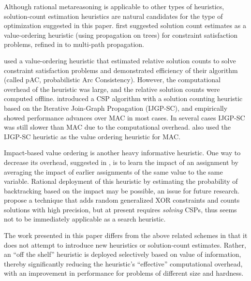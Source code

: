 Although rational metareasoning is applicable 
to other types of heuristics, solution-count estimation heuristics are
natural candidates for the type of optimization suggested in this paper.
\cite{Dechter.cspheur} first suggested solution
count estimates as a value-ordering heuristic (using propagation on trees)
for constraint satisfaction problems, refined in \cite{Meisels.solcount} to multi-path propagation.

\cite{HorschHavens.pac} used a value-ordering heuristic that estimated
relative solution counts to solve constraint satisfaction problems and
demonstrated efficiency of their algorithm (called pAC, probabilistic
Arc Consistency). However, the computational overhead of the heuristic was large,
and the relative solution counts were
computed offline. \cite{Kask.solcount} introduced a CSP algorithm
with a solution counting heuristic based on the Iterative Join-Graph Propagation
(IJGP-SC), and empirically showed performance advances over MAC in most cases.
In several cases IJGP-SC was still slower than MAC due to the computational
overhead. \cite{Kask.solcount} also used the IJGP-SC heuristic as the
value ordering heuristic for MAC.

Impact-based value ordering
\cite{Refalo.impact} is another heavy informative heuristic.  
One way to decrease its overhead, suggested in
\cite{Refalo.impact}, is to learn the impact of an assignment by averaging the impact of
earlier assignments of the same value to the same
variable. Rational deployment of this heuristic by estimating the probability 
of backtracking based on the impact may be possible, an issue for future research.
\cite{Gomes.solcount} propose a technique that adds random generalized XOR
constraints and counts solutions with high precision, but at present requires {\em solving} CSPs,
thus seems not to be immediately applicable as a search heuristic.

The work presented in this paper differs from the above related
schemes in that it does not attempt to introduce new heuristics
or solution-count estimates. Rather, an ``off the shelf''
heuristic is deployed selectively based on value of information,
thereby significantly reducing the heuristic's ``effective''
computational overhead, with an improvement in 
performance for problems of different size and hardness.


